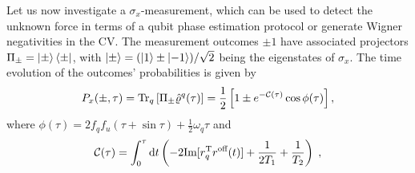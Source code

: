 \documentclass[%
reprint,
superscriptaddress,
nofootinbib,
 amsmath,amssymb,
prx,
floatfix,
]{revtex4-2}
\begin{document}
Let us now investigate a $\sigma_x$-measurement, which can be used to detect the unknown force in terms of a qubit phase estimation protocol or generate Wigner negativities in the CV. The measurement outcomes $\pm1$ have associated projectors $\Pi_\pm = \ket{\pm}\bra{\pm}$, with $ \ket{\pm} = (\ket{1}\pm\ket{-1})/\sqrt{2}$ being the eigenstates of $\sigma_x$. The time evolution of the outcomes' probabilities is given by
\begin{align}
\label{eq:probability_SG}
    P_x(\pm, \tau) = \text{Tr}_q\left[\Pi_\pm \hat{\varrho}^q(\tau)\right] = \frac{1}{2} \left[ 1 \pm {e\rm}^{-\mathcal{C} (\tau)} \cos  \phi (\tau)  \right], \nonumber
\end{align}
where $\phi(\tau) = 2 f_q f_u (\tau +\sin \tau ) + \frac{1}{2} \omega_q \tau $ and
\begin{equation}
    \mathcal{C} (\tau) = \int_{0}^{\tau} \text{d}t \left( - 2 \text{Im} [r_q^{\rm T} r^{\text{off}} (t) ] + \frac{1}{2 T_1}  + \frac{1}{T_2}  \right) \;,
\end{equation}
\end{document}
